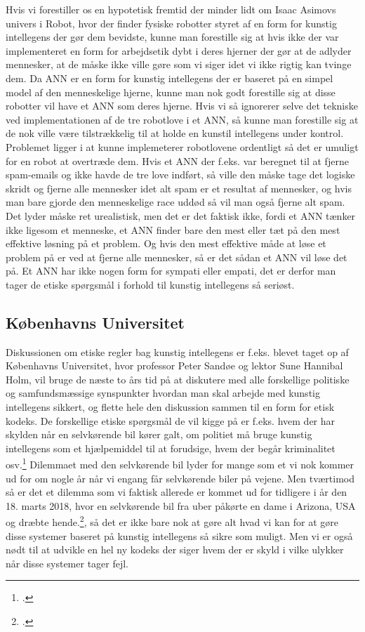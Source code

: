 Hvis vi forestiller os en hypotetisk fremtid der minder lidt om Isaac Asimovs univers i Robot, hvor der finder fysiske robotter styret af en form for kunstig intellegens
der gør dem bevidste, kunne man forestille sig at hvis ikke der var implementeret en form for arbejdsetik dybt i deres hjerner der gør at de adlyder mennesker, at de måske ikke
ville gøre som vi siger idet vi ikke rigtig kan tvinge dem. Da ANN er en form for kunstig intellegens der er baseret på en simpel model af den menneskelige hjerne, kunne man
nok godt forestille sig at disse robotter vil have et ANN som deres hjerne. Hvis vi så ignorerer selve det tekniske ved implementationen af de tre robotlove i et ANN, så kunne
man forestille sig at de nok ville være tilstrækkelig til at holde en kunstil intellegens under kontrol. Problemet ligger i at kunne implemeterer robotlovene ordentligt så det
er umuligt for en robot at overtræde dem. Hvis et ANN der f.eks. var beregnet til at fjerne spam-emails og ikke havde de tre love indført, så ville den måske tage det logiske
skridt og fjerne alle mennesker idet alt spam er et resultat af mennesker, og hvis man bare gjorde den menneskelige race uddød så vil man også fjerne alt spam. Det lyder måske
ret urealistisk, men det er det faktisk ikke, fordi et ANN tænker ikke ligesom et menneske, et ANN finder bare den mest eller tæt på den mest effektive løsning på et problem. Og
hvis den mest effektive måde at løse et problem på er ved at fjerne alle mennesker, så er det sådan et ANN vil løse det på. Et ANN har ikke nogen form for sympati eller empati,
det er derfor man tager de etiske spørgsmål i forhold til kunstig intellegens så seriøst.

\subsection{Københavns Universitet}

Diskussionen om etiske regler bag kunstig intellegens er f.eks. blevet taget op af Københavns Universitet, hvor professor Peter Sandøe og lektor Sune Hannibal Holm,
vil bruge de næste to års tid på at diskutere med alle forskellige politiske og samfundsmæssige synspunkter hvordan man skal arbejde med kunstig intellegens sikkert,
og flette hele den diskussion sammen til en form for etisk kodeks. De forskellige etiske spørgsmål de vil kigge på er f.eks. hvem der har skylden
når en selvkørende bil kører galt, om politiet må bruge kunstig intellegens som et hjælpemiddel til at forudsige, hvem der begår kriminalitet osv.\footcite{kunyt} Dilemmaet med den
selvkørende bil lyder for mange som et vi nok kommer ud for om nogle år når vi engang får selvkørende biler på vejene. Men tværtimod så er det et dilemma som vi faktisk allerede er
kommet ud for tidligere i år den 18. marts 2018, hvor en selvkørende bil fra uber påkørte en dame i Arizona, USA og dræbte hende.\footcite{nyt}, så det er ikke bare nok at gøre
alt hvad vi kan for at gøre disse systemer baseret på kunstig intellegens så sikre som muligt. Men vi er også nødt til at udvikle en hel ny kodeks der siger hvem der er skyld
i vilke ulykker når disse systemer tager fejl.

